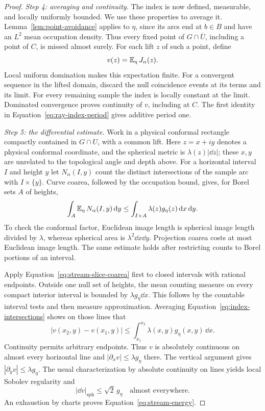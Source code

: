 \begin{proof}
\smallskip\noindent\emph{Step 4: averaging and continuity.}
The index is now defined, measurable, and locally uniformly bounded.
We use these properties to average it.
Lemma~\ref{lem:point-avoidance} applies to $\eta$, since its arcs
end at $b\in B$ and have an $L^2$ mean occupation density.
Thus every fixed point of $G\cap\overline U$, including a point
of $C$, is missed almost surely.  For each lift $z$ of such a point,
define
\[
 v(z)=\operatorname{\mathbb E}_\eta J_\alpha(z).
\]
Local uniform domination makes this expectation finite.  For a
convergent sequence in the lifted domain, discard the null coincidence
events at its terms and its limit.  For every remaining sample the
index is locally constant at the limit.  Dominated convergence proves
continuity of $v$, including at $C$.  The first identity in
Equation~\eqref{eq:ray-index-period} gives additive period one.

\smallskip\noindent\emph{Step 5: the differential estimate.}
Work in a physical conformal rectangle compactly contained in $G\cap U$,
with a common lift.  Here $z=x+iy$ denotes a physical conformal
coordinate, and the spherical metric is $\lambda(z)|\dd z|$; these
$x,y$ are unrelated to the topological angle and depth above.
For a horizontal interval $I$ and height $y$ let
$N_\alpha(I,y)$ count the distinct intersections of the sample arc
with $I\times\{y\}$.  Curve coarea, followed by the occupation bound,
gives, for Borel sets $A$ of heights,
\begin{equation}\label{eq:stream-slice-coarea}
 \int_A\operatorname{\mathbb E}_\eta N_\alpha(I,y)\,\mathrm d y
 \le \int_{I\times A}\lambda(z)g_\eta(z)\,\mathrm d x\,\mathrm d y.
\end{equation}
To check the conformal factor, Euclidean image length is spherical
image length divided by $\lambda$, whereas spherical area is
$\lambda^2\dd x\dd y$.  Projection coarea costs at most Euclidean
image length.  The same estimate holds after restricting counts to
Borel portions of an interval.

Apply Equation~\eqref{eq:stream-slice-coarea} first to closed intervals
with rational endpoints.  Outside one null set of heights, the mean
counting measure on every compact interior interval is bounded by
$\lambda g_\eta\dd x$.  This follows by the countable interval tests
and then measure approximation.  Averaging
Equation~\eqref{eq:index-intersections} shows on those lines that
\[
 |v(x_2,y)-v(x_1,y)|
 \le\int_{x_1}^{x_2}\lambda(x,y)g_\eta(x,y)\,\dd x.
\]
Continuity permits arbitrary endpoints.  Thus $v$ is absolutely
continuous on almost every horizontal line and
$|\partial_xv|\le\lambda g_\eta$ there.  The vertical argument gives
$|\partial_yv|\le\lambda g_\eta$.  The usual characterization by
absolute continuity on lines yields local Sobolev regularity and
\[
 |\dd v|_{\mathrm{sph}}\le\sqrt2\,g_\eta
 \quad\text{almost everywhere}.
\]
An exhaustion by charts proves Equation~\eqref{eq:stream-energy}.


\end{proof}
